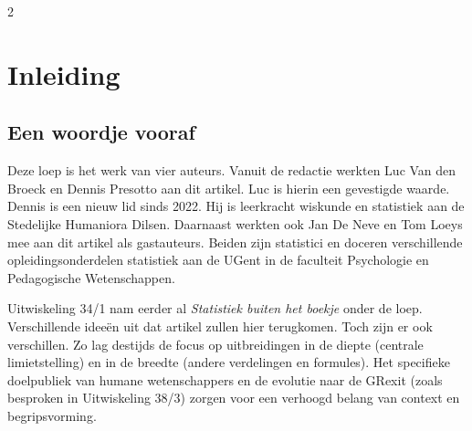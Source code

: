 

\startcontents[inhoudloep]	%

\begin{multicols}{2}
	
	\inhoudstafelloep			%
	
	\section{Inleiding}
        \subsection*{Een woordje vooraf}
        Deze loep is het werk van vier auteurs. Vanuit de redactie werkten Luc Van den Broeck en Dennis Presotto aan dit artikel. Luc is hierin een gevestigde waarde. Dennis is een nieuw lid sinds 2022. Hij is leerkracht wiskunde en statistiek aan de Stedelijke Humaniora Dilsen. Daarnaast werkten ook Jan De Neve en Tom Loeys mee aan dit artikel als gastauteurs. Beiden zijn statistici en doceren verschillende opleidingsonderdelen statistiek aan de UGent in de faculteit Psychologie en Pedagogische Wetenschappen.

        Uitwiskeling 34/1 nam eerder al \emph{Statistiek buiten het boekje} onder de loep. Verschillende idee\"en uit dat artikel zullen hier terugkomen. Toch zijn er ook verschillen. Zo lag destijds de focus op uitbreidingen in de diepte (centrale limietstelling) en in de breedte (andere verdelingen en formules). Het specifieke doelpubliek van humane wetenschappers en de evolutie naar de GRexit (zoals besproken in Uitwiskeling 38/3) zorgen voor een verhoogd belang van context en begripsvorming.
        

\end{multicols}
